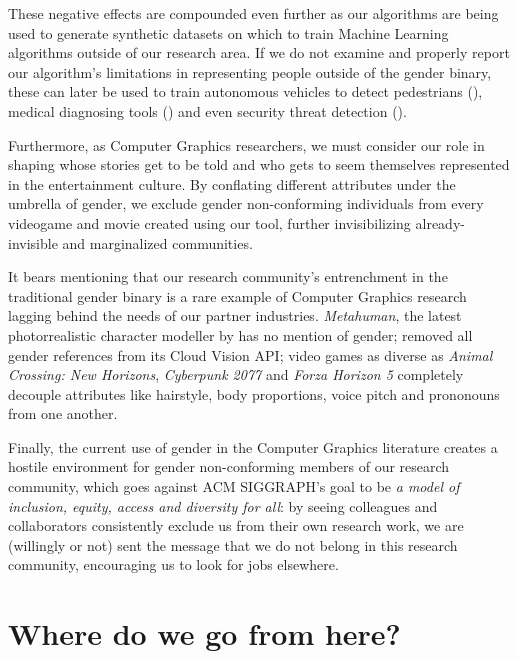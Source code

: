 \documentclass[sigconf,review,balance=false]{acmart}
\begin{document}
These negative effects are compounded even further as our algorithms are being
used to generate synthetic datasets on which to train Machine Learning
algorithms outside of our research area. If we do not examine and properly
report our algorithm's limitations in representing people outside of the gender
binary, these can later be used to train autonomous vehicles to detect
pedestrians (\cite{cars}), medical diagnosing tools (\cite{chen2021synthetic})
and even security threat detection (\cite{dhs}).

Furthermore, as Computer Graphics researchers, we must consider our role in
shaping whose stories get to be told and who gets to seem themselves represented
in the entertainment culture. By conflating different attributes under the
umbrella of gender, we exclude gender non-conforming individuals from every
videogame and movie created using our tool, further invisibilizing
already-invisible and marginalized communities.

It bears mentioning that our research community's entrenchment in the
traditional gender binary is a rare example of Computer Graphics research
lagging behind the needs of our partner industries. \emph{Metahuman}, the latest
photorrealistic character modeller by \citet{metahuman} has no mention of
gender; \citet{googlegender} removed all gender references from its Cloud Vision
API; video games as diverse as \emph{Animal Crossing: New Horizons},
\emph{Cyberpunk 2077} and \emph{Forza Horizon 5} completely decouple attributes
like hairstyle, body proportions, voice pitch and prononouns from one another. 

Finally, the current use of gender in the Computer Graphics literature creates a
hostile environment for gender non-conforming members of our research community,
which goes against ACM SIGGRAPH's goal to be \emph{a model of inclusion, equity,
access and diversity for all}:  by seeing colleagues and collaborators
consistently exclude us  from their own research work, we are (willingly or not)
sent the message that we do not belong in this research community, encouraging
us to look for jobs elsewhere.

\section{Where do we go from here?}
\end{document}
